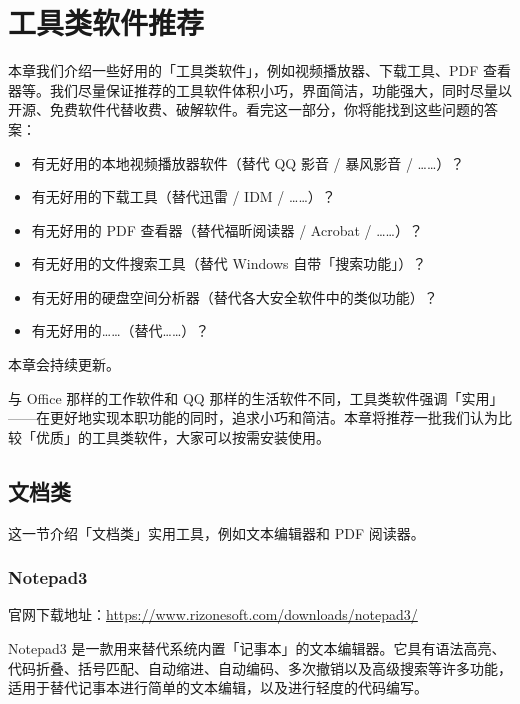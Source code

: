 \chapter{工具类软件推荐}
\label{tools-software}

\begin{intro}
  本章我们介绍一些好用的「工具类软件」，例如视频播放器、下载工具、PDF 查看器等。我们尽量保证推荐的工具软件体积小巧，界面简洁，功能强大，同时尽量以开源、免费软件代替收费、破解软件。看完这一部分，你将能找到这些问题的答案：

  \begin{itemize}
    \item 有无好用的本地视频播放器软件（替代 QQ 影音 / 暴风影音 / ……）？
    \item 有无好用的下载工具（替代迅雷 / IDM / ……）？
    \item 有无好用的 PDF 查看器（替代福昕阅读器 / Acrobat / ……）？
    \item 有无好用的文件搜索工具（替代 Windows 自带「搜索功能」）？
    \item 有无好用的硬盘空间分析器（替代各大安全软件中的类似功能）？
    \item 有无好用的……（替代……）？
  \end{itemize}
\end{intro}

\begin{note}
  本章会持续更新。
\end{note}

与 Office 那样的工作软件和 QQ 那样的生活软件不同，工具类软件强调「实用」——在更好地实现本职功能的同时，追求小巧和简洁。本章将推荐一批我们认为比较「优质」的工具类软件，大家可以按需安装使用。

\section{文档类}

这一节介绍「文档类」实用工具，例如文本编辑器和 PDF 阅读器。

\subsection{Notepad3}

官网下载地址：\url{https://www.rizonesoft.com/downloads/notepad3/}

Notepad3 是一款用来替代系统内置「记事本」的文本编辑器。它具有语法高亮、代码折叠、括号匹配、自动缩进、自动编码、多次撤销以及高级搜索等许多功能，适用于替代记事本进行简单的文本编辑，以及进行轻度的代码编写。

